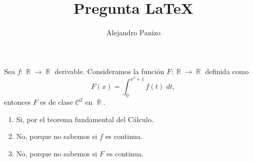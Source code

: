 \documentclass[10pt,spanish,hyperref={pdfpagelabels=false}]{beamer}
\author{Alejandro Panizo}
\title{Pregunta \LaTeX}
\DeclareMathOperator{\RR}{\mathbb{R}}
\begin{document}
\Large

\rightskip=0pt

\begin{frame}

Sea $f:\RR \to \RR $ derivable. Consideramos la funci\'{o}n $F:\RR \to \RR $ definida como
$$ F(x)=\int _0^{x^2+1} f(t)\; dt,$$ entonces $F$ es de clase $\mathcal {C}^2$ en $\RR$.

\begin{enumerate}[1.] \rightskip=0pt
\item Si, por el teorema fundamental del C\'{a}lculo.
\item No, porque no sabemos si $f$ es continua.
\item  No, porque no sabemos si $F$ es continua.
\end{enumerate}

\end{frame}
\end{document}
